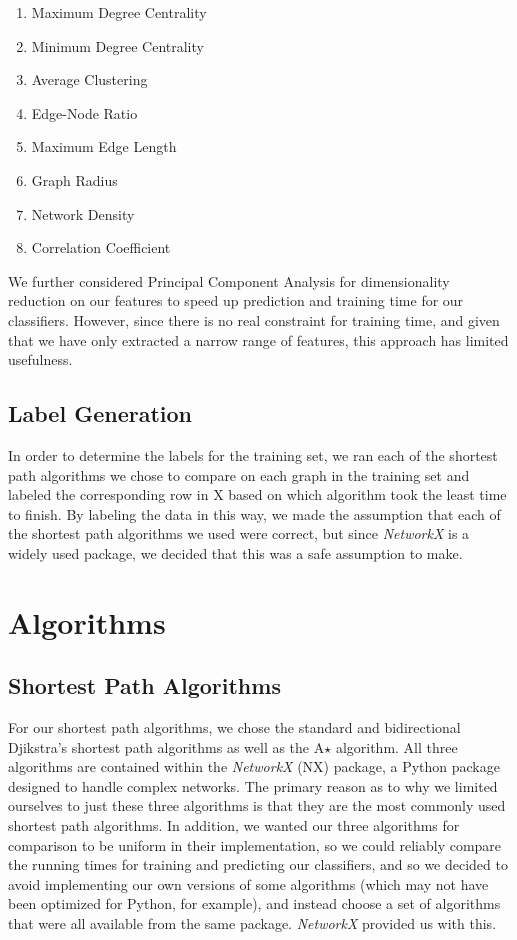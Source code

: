 \documentclass{article}
\begin{document}
\begin{enumerate}
\item Maximum Degree Centrality
\item Minimum Degree Centrality
\item Average Clustering
\item Edge-Node Ratio
\item Maximum Edge Length
\item Graph Radius
\item Network Density
\item Correlation Coefficient

\end{enumerate}

We further considered Principal Component Analysis for dimensionality reduction on our features to speed up prediction and training time for our classifiers. However, since there is no real constraint for training time, and given that we have only extracted a narrow range of features, this approach has limited usefulness.

\subsection{Label Generation}

In order to determine the labels for the training set, we ran each of the shortest path algorithms we chose to compare on each graph in the training set and labeled the corresponding row in X based on which algorithm took the least time to finish. By labeling the data in this way, we made the assumption that each of the shortest path algorithms we used were correct, but since \textit{NetworkX} is a widely used package, we decided that this was a safe assumption to make.

\section{Algorithms}

\subsection{Shortest Path Algorithms}

For our shortest path algorithms, we chose the standard and bidirectional Djikstra's shortest path algorithms as well as the A$\star$ algorithm. All three algorithms are contained within the \textit{NetworkX} (NX) package, a Python package designed to handle complex networks. The primary reason as to why we limited ourselves to just these three algorithms is that they are the most commonly used shortest path algorithms. In addition, we wanted our three algorithms for comparison to be uniform in their implementation, so we could reliably compare the running times for training and predicting our classifiers, and so we decided to avoid implementing our own versions of some algorithms (which may not have been optimized for Python, for example), and instead choose a set of algorithms that were all available from the same package. \textit{NetworkX} provided us with this.
\end{document}
